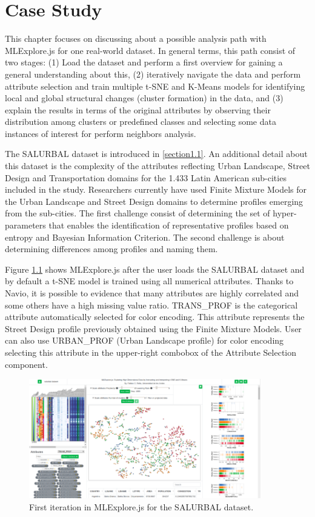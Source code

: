 
\chapter{Case Study}
\label{chapter4}

\graphicspath{{Chapter4/figs/}}

This chapter focuses on discussing about a possible analysis path with MLExplore.js for one real-world dataset. In general terms, this path consist of two stages: (1) Load the dataset and perform a first overview for gaining a general understanding about this, (2) iteratively navigate the data and perform attribute selection and train multiple t-SNE and K-Means models for identifying local and global structural changes (cluster formation) in the data, and (3) explain the results in terms of the original attributes by observing their distribution among clusters or predefined classes and selecting some data instances of interest for perform neighbors analysis.

The SALURBAL dataset is introduced in \ref{section1.1}. An additional detail about this dataset is the complexity of the attributes reflecting Urban Landscape, Street Design and Transportation domains for the 1.433 Latin American sub-cities included in the study. Researchers currently have used Finite Mixture Models for the Urban Landscape and Street Design domains to determine profiles emerging from the sub-cities. The first challenge consist of determining the set of hyper-parameters that enables the identification of representative profiles based on entropy and Bayesian Information Criterion. The second challenge is about determining differences among profiles and naming them.

Figure \ref{fig:salurbal-case-study-1} shows MLExplore.js after the user loads the SALURBAL dataset and by default a t-SNE model is trained using all numerical attributes. Thanks to Navio, it is possible to evidence that many attributes are highly correlated and some others have a high missing value ratio. TRANS\_PROF is the categorical attribute automatically selected for color encoding. This attribute represents the Street Design profile previously obtained using the Finite Mixture Models. User can also use URBAN\_PROF (Urban Landscape profile) for color encoding selecting this attribute in the upper-right combobox of the Attribute Selection component.

\begin{figure}[ht]
 \centering
 \includegraphics[width=0.9\textwidth]{salurbal-case-study-1.png}
 \caption{First iteration in MLExplore.js for the SALURBAL dataset.}
 \label{fig:salurbal-case-study-1}
\end{figure}

